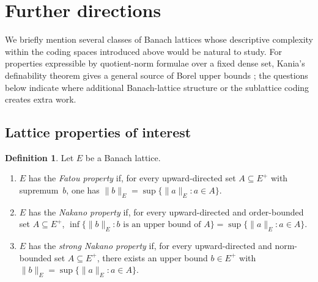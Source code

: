 \documentclass[12pt]{amsart}
\theoremstyle{plain}
\theoremstyle{definition}
\newtheorem{definition}[theorem]{Definition}
\theoremstyle{remark}
\DeclareMathOperator{\FBL}{FBL}
\begin{document}


\section{Further directions}\label{sec:further}

We briefly mention several classes of Banach lattices whose descriptive
complexity within the coding spaces introduced above would be natural to study.
For properties expressible by quotient-norm formulae over a fixed dense set,
Kania's definability theorem gives a general source of Borel upper bounds
\cite[Theorem~3.16]{Kan2026Pol}; the questions below indicate where additional
Banach-lattice structure or the sublattice coding creates extra work.

\subsection{Lattice properties of interest}

\begin{definition}
Let $E$ be a Banach lattice.
\begin{enumerate}[label=(\roman*)]
    \item $E$ has the \emph{Fatou property} if, for every upward-directed set
      $A \subseteq E^+$ with supremum~$b$, one has
      $\lVert b \rVert_E = \sup\{\lVert a \rVert_E \colon a \in A\}$.
    \item $E$ has the \emph{Nakano property} if, for every upward-directed and
      order-bounded set $A \subseteq E^+$,
      $\inf\{\lVert b \rVert_E \colon b \text{ is an upper bound of } A\}
      = \sup\{\lVert a \rVert_E \colon a \in A\}$.
    \item $E$ has the \emph{strong Nakano property} if, for every
      upward-directed and norm-bounded set $A \subseteq E^+$, there exists an
      upper bound $b \in E^+$ with
      $\lVert b \rVert_E = \sup\{\lVert a \rVert_E \colon a \in A\}$.
\end{enumerate}
\end{definition}
\end{document}
